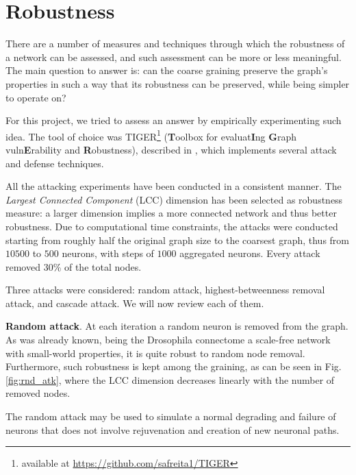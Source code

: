 \section{Robustness}
There are a number of measures and techniques through which the robustness of a network can be assessed, and such assessment can be more or less meaningful. The main question to answer is: can the coarse graining preserve the graph's properties in such a way that its robustness can be preserved, while being simpler to operate on?

For this project, we tried to assess an answer by empirically experimenting such idea. The tool of choice was TIGER\footnote{available at \href{https://github.com/safreita1/TIGER}{https://github.com/safreita1/TIGER}} (\textbf{T}oolbox for evaluat\textbf{I}ng \textbf{G}raph vuln\textbf{E}rability and \textbf{R}obustness), described in \cite{freitas2020tiger}, which implements several attack and defense techniques. 

All the attacking experiments have been conducted in a consistent manner. The \textit{Largest Connected Component} (LCC) dimension has been selected as robustness measure: a larger dimension implies a more connected network and thus better robustness. Due to computational time constraints, the attacks were conducted starting from roughly half the original graph size to the coarsest graph, thus from $10500$ to $500$ neurons, with steps of $1000$ aggregated neurons. Every attack removed 30\% of the total nodes.

Three attacks were considered: random attack, highest-betweenness removal attack, and cascade attack. We will now review each of them.

\vspace{\baselineskip}
\noindent \textbf{Random attack}. At each iteration a random neuron is removed from the graph. As was already known, being the Drosophila connectome a scale-free network with small-world properties, it is quite robust to random node removal. Furthermore, such robustness is kept among the graining, as can be seen in Fig. \ref{fig:rnd_atk}, where the LCC dimension decreases linearly with the number of removed nodes. 

The random attack may be used to simulate a normal degrading and failure of neurons that does not  involve rejuvenation and creation of new neuronal paths. 

